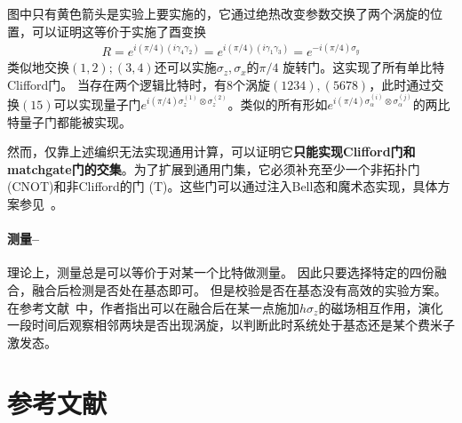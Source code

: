 \documentclass[12pt,letterpaper]{article}
\begin{document}
图中只有黄色箭头是实验上要实施的，它通过绝热改变参数交换了两个涡旋的位置，可以证明这等价于实施了酉变换
\begin{align}
    R = e^{i(\pi/4)(i\gamma_{4}\gamma_{2})} =e^{i(\pi/4)(i\gamma_{1}\gamma_{3})} =e^{-i(\pi/4)\sigma_y}
\end{align}
类似地交换$(1,2);(3,4)$还可以实施$\sigma_z,\sigma_x$的$\pi/4$ 旋转门。这实现了所有单比特Clifford门。
当存在两个逻辑比特时，有$8$个涡旋$(1234),(5678)$，此时通过交换$(15)$可以实现量子门$e^{i(\pi/4)\sigma_z^{(1)} \otimes\sigma_z^{(2)}}$。类似的所有形如$e^{i(\pi/4)\sigma_{\alpha}^{(i)} \otimes\sigma_{\alpha}^{(j)}}$的两比特量子门都能被实现。

然而，仅靠上述编织无法实现通用计算，可以证明它\textbf{只能实现Clifford门和matchgate门的交集}。为了扩展到通用门集，它必须补充至少一个非拓扑门 (CNOT)和非Clifford的门 (T)。这些门可以通过注入Bell态和魔术态实现，具体方案参见~\cite{PhysRevA.73.042313}。

\paragraph{测量--}
理论上，测量总是可以等价于对某一个比特做测量。
因此只要选择特定的四份融合，融合后检测是否处在基态即可。
但是校验是否在基态没有高效的实验方案。
在参考文献~\cite{PhysRevX.13.031008}中，作者指出可以在融合后在某一点施加$h\sigma_z$的磁场相互作用，演化一段时间后观察相邻两块是否出现涡旋，以判断此时系统处于基态还是某个费米子激发态。

\section{参考文献}
\printbibliography

\makeatletter
\newcommand{\appendixtitle}[1]{\gdef\@title{#1}}
\newcommand{\appendixauthor}[1]{\gdef\@author{#1}}
\newcommand{\appendixaffiliation}[1]{\gdef\@affiliation{#1}}
\newcommand{\appendixdate}[1]{\gdef\@date{#1}}
\makeatother
\makeatletter%
\newcommand{\appendixmaketitle}{%
\begin{center}%
\vspace{0.4in}%
{\Large \@title \par}%
\end{center}%
\par%
}%
\makeatother%
\end{document}

